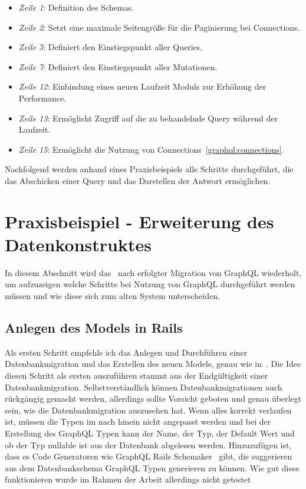 \begin{itemize}
	\setlength\itemsep{-1em}
	\item \emph{Zeile 1}: Definition des Schemas.
	\item \emph{Zeile 2}: Setzt eine maximale Seitengröße für die Paginierung bei Connections.
	\item \emph{Zeile 5}: Definiert den Einstiegspunkt aller Queries.
	\item \emph{Zeile 7}: Definiert den Einstiegspunkt aller Mutationen.
	\item \emph{Zeile 12}: Einbindung eines neuen Laufzeit Moduls zur Erhöhung der Performance.
	\item \emph{Zeile 13}: Ermöglicht Zugriff auf die zu behandelnde Query während der Laufzeit.
	\item \emph{Zeile 15}: Ermöglicht die Nutzung von Connections~\ref{graphql:connections}.
\end{itemize}

Nachfolgend werden anhand eines Praxisbeispiels alle Schritte durchgeführt, die das Abschicken einer Query und das Darstellen der Antwort ermöglichen.

\section{Praxisbeispiel - Erweiterung des Datenkonstruktes}
In diesem Abschnitt wird das~ nach erfolgter Migration von GraphQL wiederholt, um aufzuzeigen welche Schritte bei Nutzung von GraphQL durchgeführt werden müssen und wie diese sich zum alten System unterscheiden.

\subsection{Anlegen des Models in Rails}
\label{impl:graphql:model}
Als ersten Schritt empfehle ich das Anlegen und Durchführen einer Datenbankmigration und das Erstellen des neuen Models, genau wie in~. Die Idee diesen Schritt als ersten auszuführen stammt aus der Endgültigkeit einer Datenbankmigration. Selbstverständlich können Datenbankmigrationen auch rückgängig gemacht werden, allerdings sollte Vorsicht geboten und genau überlegt sein, wie die Datenbankmigration auszusehen hat. Wenn alles korrekt verlaufen ist, müssen die Typen im nach hinein nicht angepasst werden und bei der Erstellung des GraphQL Typen kann der Name, der Typ, der Default Wert und ob der Typ nullable ist aus der Datenbank abgelesen werden. Hinzuzufügen ist, dass es Code Generatoren wie GraphQL Rails Schemaker~\cite{graphql-rails-schemaker} gibt, die suggerieren aus dem Datenbankschema GraphQL Typen generieren zu können. Wie gut diese funktionieren wurde im Rahmen der Arbeit allerdings nicht getestet

